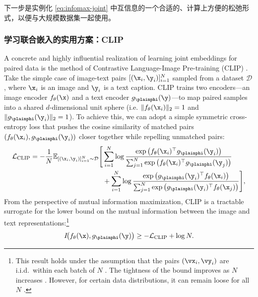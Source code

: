 \documentclass[../../book-main_zh.tex]{subfiles}
\begin{document}
下一步是实例化 \eqref{eq:infomax-joint} 中互信息的一个合适的、计算上方便的松弛形式，以便与大规模数据集一起使用。



\subsubsection{学习联合嵌入的实用方案：CLIP}

A concrete and highly influential realization of learning joint embeddings for paired data is the method of Contrastive Language-Image Pre-training (CLIP) \cite{radford2021learning}. 
Take the simple case of image-text pairs $[(\x_i, \y_i)]_{i=1}^N$ sampled from a dataset $\mathcal{D}$, where $\x_i$ is an image and $\y_i$ is a text caption.
CLIP trains two encoders—an image encoder $f_{\theta}(\x)$ and a text encoder $g_{\plainphi}(\y)$—to map paired samples into a shared $d$-dimensional unit sphere (i.e. $\|f_{\theta}(\x_i)\|_2 = 1$ and $\|g_{\plainphi}(\y_i)\|_2 = 1$).  
To achieve this, we can adopt a simple symmetric cross-entropy loss that pushes the cosine similarity of matched pairs $(f_{\theta}(\x_i),g_{\plainphi}(\y_i))$ closer together while repelling unmatched pairs:
\begin{align}
    \mathcal{L}_{\mathrm{CLIP}} = -\frac{1}{N}\mathbb{E}_{[(\x_i, \y_i)]_{i=1}^N \sim
    \mathcal{D}} \Biggr[  &\sum_{i=1}^N\log \frac{\exp\left( f_{\theta}(\x_i)^\top g_{\plainphi}(\y_i) \right)}{\sum_{j=1}^N \exp\left( f_{\theta}(\x_i)^\top g_{\plainphi}(\y_j) \right)} \nonumber \\
     &+\sum_{i=1}^N\log \frac{\exp\left( g_{\plainphi}(\y_i)^\top f_{\theta}(\x_i) \right)}{\sum_{j=1}^N \exp\left( g_{\plainphi}(\y_i)^\top f_{\theta}(\x_j) \right)} \Biggr], \label{eq:clip-loss}
\end{align}
From the perspective of mutual information maximization, CLIP is a tractable
surrogate for the lower bound on the mutual information between the image and
text representations:\footnote{This result holds under the assumption that the
pairs $(\vx_i, \vy_i)$ are i.i.d.\ within each batch of $N$
\cite[Lemma 1]{Oko2025-wk}. The tightness of the bound improves as $N$ increases
\cite{Van_den_Oord2018-qf}.
However, for certain data distributions, it can remain loose for all $N$
\cite{mcallester2019formal,10.5555/3524938.3525859}.}
\begin{equation}
    I\!\big(f_{\theta}(\x),g_{\plainphi}(\y)\big) \geq - \mathcal{L}_{\mathrm{CLIP}} + \log N.
\end{equation}
\end{document}
